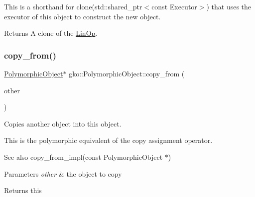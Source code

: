 This is a shorthand for clone(std\+::shared\+\_\+ptr$<$const Executor$>$) that uses the executor of this object to construct the new object.

\begin{DoxyReturn}{Returns}
A clone of the \hyperlink{classgko_1_1LinOp}{Lin\+Op}. 
\end{DoxyReturn}
\mbox{\label{classgko_1_1PolymorphicObject_a5e6f713938293cfbe788d00480eb4d81}} 
\subsubsection{\texorpdfstring{copy\+\_\+from()}{copy\_from()}\hspace{0.1cm}{\footnotesize\ttfamily [1/2]}}
{\footnotesize\ttfamily \hyperlink{classgko_1_1PolymorphicObject}{Polymorphic\+Object}$\ast$ gko\+::\+Polymorphic\+Object\+::copy\+\_\+from (\begin{DoxyParamCaption}\item[{const \hyperlink{classgko_1_1PolymorphicObject}{Polymorphic\+Object} $\ast$}]{other }\end{DoxyParamCaption})}



Copies another object into this object. 

This is the polymorphic equivalent of the copy assignment operator.

\begin{DoxySeeAlso}{See also}
copy\+\_\+from\+\_\+impl(const Polymorphic\+Object $\ast$)
\end{DoxySeeAlso}

\begin{DoxyParams}{Parameters}
{\em other} & the object to copy\\
\hline
\end{DoxyParams}
\begin{DoxyReturn}{Returns}
this 
\end{DoxyReturn}
\mbox{\label{classgko_1_1PolymorphicObject_ae6ba40d3fb5e1e73cd92f4830a34c999}} 
